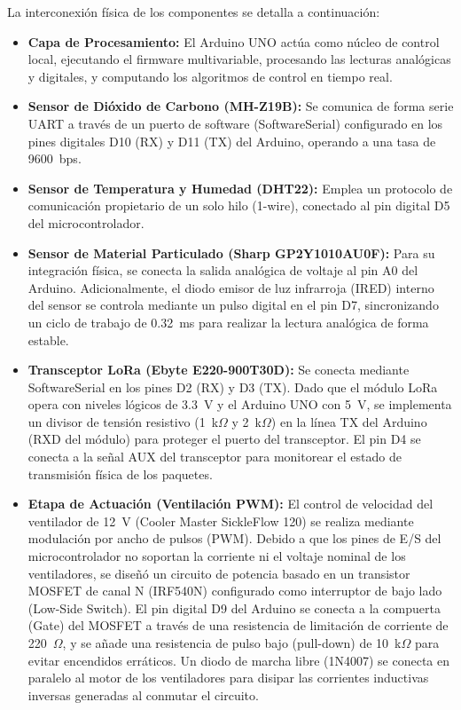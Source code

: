 La interconexión física de los componentes se detalla a continuación:
\begin{itemize}
    \item \textbf{Capa de Procesamiento:} El Arduino UNO actúa como núcleo de control local, ejecutando el firmware multivariable, procesando las lecturas analógicas y digitales, y computando los algoritmos de control en tiempo real.
    \item \textbf{Sensor de Dióxido de Carbono (MH-Z19B):} Se comunica de forma serie UART a través de un puerto de software (SoftwareSerial) configurado en los pines digitales D10 (RX) y D11 (TX) del Arduino, operando a una tasa de 9600~bps.
    \item \textbf{Sensor de Temperatura y Humedad (DHT22):} Emplea un protocolo de comunicación propietario de un solo hilo (1-wire), conectado al pin digital D5 del microcontrolador.
    \item \textbf{Sensor de Material Particulado (Sharp GP2Y1010AU0F):} Para su integración física, se conecta la salida analógica de voltaje al pin A0 del Arduino. Adicionalmente, el diodo emisor de luz infrarroja (IRED) interno del sensor se controla mediante un pulso digital en el pin D7, sincronizando un ciclo de trabajo de 0.32~ms para realizar la lectura analógica de forma estable.
    \item \textbf{Transceptor LoRa (Ebyte E220-900T30D):} Se conecta mediante SoftwareSerial en los pines D2 (RX) y D3 (TX). Dado que el módulo LoRa opera con niveles lógicos de 3.3~V y el Arduino UNO con 5~V, se implementa un divisor de tensión resistivo (1~k$\Omega$ y 2~k$\Omega$) en la línea TX del Arduino (RXD del módulo) para proteger el puerto del transceptor. El pin D4 se conecta a la señal AUX del transceptor para monitorear el estado de transmisión física de los paquetes.
    \item \textbf{Etapa de Actuación (Ventilación PWM):} El control de velocidad del ventilador de 12~V (Cooler Master SickleFlow 120) se realiza mediante modulación por ancho de pulsos (PWM). Debido a que los pines de E/S del microcontrolador no soportan la corriente ni el voltaje nominal de los ventiladores, se diseñó un circuito de potencia basado en un transistor MOSFET de canal N (IRF540N) configurado como interruptor de bajo lado (Low-Side Switch). El pin digital D9 del Arduino se conecta a la compuerta (Gate) del MOSFET a través de una resistencia de limitación de corriente de 220~$\Omega$, y se añade una resistencia de pulso bajo (pull-down) de 10~k$\Omega$ para evitar encendidos erráticos. Un diodo de marcha libre (1N4007) se conecta en paralelo al motor de los ventiladores para disipar las corrientes inductivas inversas generadas al conmutar el circuito.
\end{itemize}

